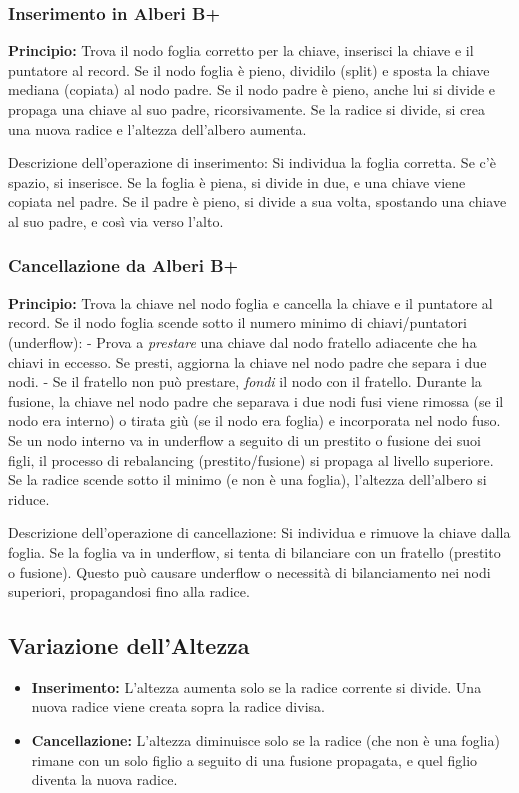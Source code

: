 \subsubsection{Inserimento in Alberi B+}
\textbf{Principio:} Trova il nodo foglia corretto per la chiave, inserisci la chiave e il puntatore al record. Se il nodo foglia è pieno, dividilo (split) e sposta la chiave mediana (copiata) al nodo padre. Se il nodo padre è pieno, anche lui si divide e propaga una chiave al suo padre, ricorsivamente. Se la radice si divide, si crea una nuova radice e l'altezza dell'albero aumenta.

Descrizione dell'operazione di inserimento: Si individua la foglia corretta. Se c'è spazio, si inserisce. Se la foglia è piena, si divide in due, e una chiave viene copiata nel padre. Se il padre è pieno, si divide a sua volta, spostando una chiave al suo padre, e così via verso l'alto.

\subsubsection{Cancellazione da Alberi B+}
\textbf{Principio:} Trova la chiave nel nodo foglia e cancella la chiave e il puntatore al record. Se il nodo foglia scende sotto il numero minimo di chiavi/puntatori (underflow):
- Prova a \textit{prestare} una chiave dal nodo fratello adiacente che ha chiavi in eccesso. Se presti, aggiorna la chiave nel nodo padre che separa i due nodi.
- Se il fratello non può prestare, \textit{fondi} il nodo con il fratello. Durante la fusione, la chiave nel nodo padre che separava i due nodi fusi viene rimossa (se il nodo era interno) o tirata giù (se il nodo era foglia) e incorporata nel nodo fuso.
Se un nodo interno va in underflow a seguito di un prestito o fusione dei suoi figli, il processo di rebalancing (prestito/fusione) si propaga al livello superiore. Se la radice scende sotto il minimo (e non è una foglia), l'altezza dell'albero si riduce.

Descrizione dell'operazione di cancellazione: Si individua e rimuove la chiave dalla foglia. Se la foglia va in underflow, si tenta di bilanciare con un fratello (prestito o fusione). Questo può causare underflow o necessità di bilanciamento nei nodi superiori, propagandosi fino alla radice.

\subsection{Variazione dell'Altezza}
\begin{itemize}
    \item \textbf{Inserimento:} L'altezza aumenta solo se la radice corrente si divide. Una nuova radice viene creata sopra la radice divisa.
    \item \textbf{Cancellazione:} L'altezza diminuisce solo se la radice (che non è una foglia) rimane con un solo figlio a seguito di una fusione propagata, e quel figlio diventa la nuova radice.
\end{itemize}

